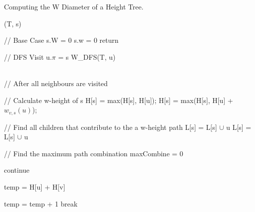 \begin{algorithm}[h]{}
\caption{Computing the W Diameter of a Height Tree.}
\begin{algorithmic}[1]
    \label{algo:dp}%

    (T, s)

    \State // Base Case
        \State s.W = 0
        \State s.w = 0
        \State return
    \EndIf


    \State // DFS Visit
            \State u.$\pi$ = s
            \State W\_DFS(T, u)
        \EndIf
    \EndFor

    \\

    \State // After all neighbours are visited

    \State // Calculate w-height of s
            \State H[s] = max(H[s], H[u]);
        \Else
                \State H[s] = max(H[s], H[u] + $w_{v, s}(u)$);
            \EndFor
        \EndIf
    \EndFor

    \State // Find all children that contribute to the a w-height path
            \State L[s] = L[s] $\cup$ u
        \Else
                    \State L[s] = L[s] $\cup$ u
                \EndIf
            \EndFor
        \EndIf

    \EndFor

    \State // Find the maximum path combination
    \State maxCombine = 0


                \State continue
            \EndIf

            \State temp = H[u] + H[v]

                        \State temp = temp + 1
                        \State break
                    \EndIf
                \EndFor
            \EndIf


\end{algorithmic}
\end{algorithm}
